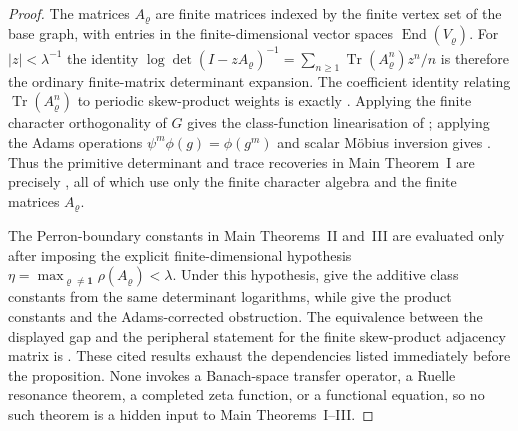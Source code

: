\documentclass[11pt,a4paper]{amsart}
\theoremstyle{plain}
\theoremstyle{definition}
\theoremstyle{remark}
\DeclareMathOperator{\Tr}{Tr}
\DeclareMathOperator{\End}{End}
\begin{document}
\begin{proof}
  The matrices \(A_\varrho\) are finite matrices indexed by the finite vertex
  set of the base graph, with entries in the finite-dimensional vector spaces
  \(\End(V_\varrho)\).  For \(|z|<\lambda^{-1}\) the identity
  \(\log\det(I-zA_\varrho)^{-1}
  =\sum_{n\ge1}\Tr(A_\varrho^n)z^n/n\) is therefore the ordinary finite-matrix
  determinant expansion.  The coefficient identity relating
  \(\Tr(A_\varrho^n)\) to periodic skew-product weights is exactly
  .  Applying the finite character
  orthogonality of \(G\) gives the class-function linearisation of
  ; applying the Adams operations
  \(\psi^m\phi(g)=\phi(g^m)\) and scalar M\"obius inversion gives
  .  Thus the primitive determinant and
  trace recoveries in Main Theorem~I are precisely
  , all of which use only the finite character
  algebra and the finite matrices \(A_\varrho\).

  The Perron-boundary constants in Main Theorems~II and~III are evaluated only
  after imposing the explicit finite-dimensional hypothesis
  \(\eta=\max_{\varrho\ne\mathbf1}\rho(A_\varrho)<\lambda\).  Under this
  hypothesis,  give the additive class constants from the same
  determinant logarithms, while
   give the
  product constants and the Adams-corrected obstruction.  The equivalence
  between the displayed gap and the peripheral statement for the finite
  skew-product adjacency matrix is .
  These cited results exhaust the dependencies listed immediately before the
  proposition.  None invokes a Banach-space transfer operator, a Ruelle
  resonance theorem, a completed zeta function, or a functional equation, so no
  such theorem is a hidden input to Main Theorems~I--III.
\end{proof}
\end{document}
